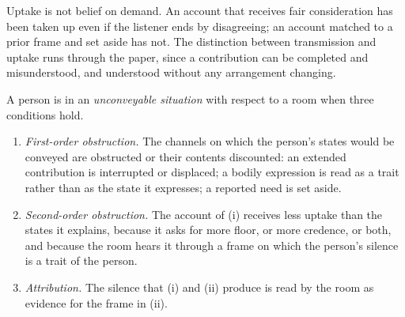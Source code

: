Uptake is not belief on demand. An account that receives fair consideration has been taken up even if the listener ends by disagreeing; an account matched to a prior frame and set aside has not. The distinction between transmission and uptake runs through the paper, since a contribution can be completed and misunderstood, and understood without any arrangement changing.

\begin{definition}\label{def:situation}
A person is in an \emph{unconveyable situation} with respect to a room when three conditions hold.
\begin{enumerate}[label=(\roman*)]
\item \emph{First-order obstruction.} The channels on which the person's states would be conveyed are obstructed or their contents discounted: an extended contribution is interrupted or displaced; a bodily expression is read as a trait rather than as the state it expresses; a reported need is set aside.
\item \emph{Second-order obstruction.} The account of (i) receives less uptake than the states it explains, because it asks for more floor, or more credence, or both, and because the room hears it through a frame on which the person's silence is a trait of the person.
\item \emph{Attribution.} The silence that (i) and (ii) produce is read by the room as evidence for the frame in (ii).
\end{enumerate}
\end{definition}

